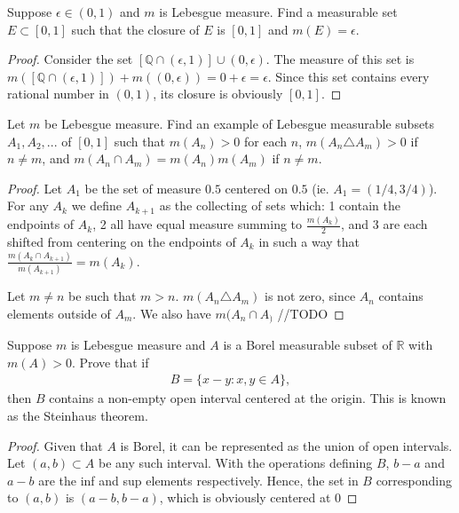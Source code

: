 \documentclass[10pt]{article}
\newcommand{\Q}{\mathbb{Q}}
\newcommand{\R}{\mathbb{R}}
\newenvironment{problem}[2][Problem]{\begin{trivlist}
		\item[\hskip \labelsep {\bfseries #1}\hskip \labelsep {\bfseries #2.}]}{\end{trivlist}}
\begin{document}
	\begin{problem}{7}
		Suppose $\epsilon \in (0,1)$ and $m$ is Lebesgue measure. Find a measurable set $E \subset [0, 1]$ such that the closure of $E$ is $[0, 1]$ and $m(E) = \epsilon$.
		\begin{proof}
			Consider the set $[\Q \cap (\epsilon,1)] \cup (0,\epsilon)$. The measure of this set is $m([\Q \cap (\epsilon,1)]) + m((0,\epsilon)) = 0 + \epsilon = \epsilon$.
			Since this set contains every rational number in $(0,1)$, its closure is obviously $[0,1]$.
		\end{proof}
	\end{problem}
	
	\begin{problem}{9}
		Let $m$ be Lebesgue measure. Find an example of Lebesgue measurable subsets $A_1, A_2, ...$ of $[0, 1]$ such that $m(A_n) > 0$ for each $n$, $m(A_n \triangle A_m) > 0$ if $n \not = m$, and $m(A_n \cap A_m ) = m(A_n)m(A_m)$ if $n \not= m$.
		\begin{proof}
			Let $A_1$ be the set of measure $0.5$ centered on $0.5$ (ie. $A_1 = (1/4, 3/4)$). For any $A_k$ we define $A_{k+1}$ as the collecting of sets which: 1 contain the endpoints of $A_k$, 2 all have equal measure summing to $\frac{m(A_k)}{2}$, and 3 are each shifted from centering on the endpoints of $A_k$ in such a way that $\frac{m(A_k \cap A_{k+1})}{m(A_{k+1})} = m(A_k)$.
			
			Let $m \not= n$ be such that $m > n$. $m(A_n \triangle A_m)$ is not zero, since $A_n$ contains elements outside of $A_m$. We also have $m(A_n \cap A_)$ //TODO
		\end{proof}
	\end{problem}
	
	\begin{problem}{11}
		Suppose $m$ is Lebesgue measure and $A$ is a Borel
		measurable subset of $\R$ with $m(A) > 0$. Prove that if
		\begin{align*}
			B = \{x - y : x, y \in A\},
		\end{align*}
		then $B$ contains a non-empty open interval centered at the origin.
		This is known as the Steinhaus theorem.
		\begin{proof}
			Given that $A$ is Borel, it can be represented as the union of open intervals. Let $(a,b) \subset A$ be any such interval. With the operations defining $B$, $b-a$ and $a-b$ are the inf and sup elements respectively. Hence, the set in $B$ corresponding to $(a,b)$ is $(a-b, b-a)$, which is obviously centered at $0$
		\end{proof}
	\end{problem}
	
\end{document}
